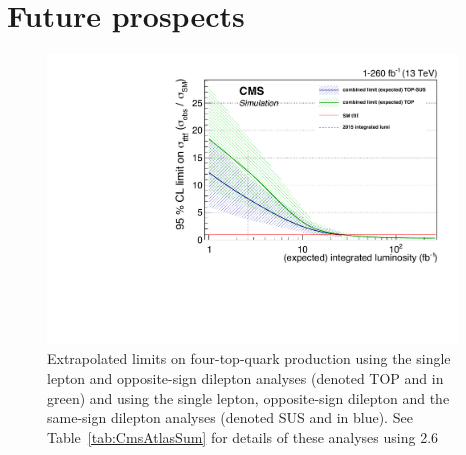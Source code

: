 \section{Future prospects}
\begin{figure}[ht!]
\begin{center}
    \includegraphics[width=0.97\textwidth]{images/Conclusion/combined_limitvslumi.pdf}
    \caption{Extrapolated limits on four-top-quark production using the single lepton and opposite-sign dilepton analyses (denoted TOP and in green) and using the single lepton, opposite-sign dilepton and the same-sign dilepton analyses (denoted SUS and in blue). See Table~\ref{tab:CmsAtlasSum} for details of these analyses using 2.6~\fbinv}
    \label{fig:ttbarXstairway}
\end{center}
\end{figure}